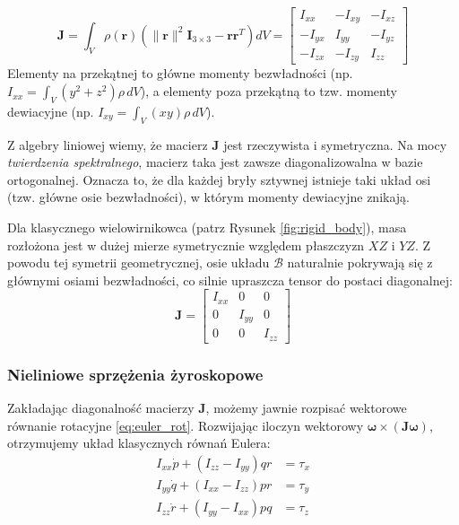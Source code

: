 \begin{equation}
    \mathbf{J} = \int_V \rho(\mathbf{r}) \left( \|\mathbf{r}\|^2 \mathbf{I}_{3\times3} - \mathbf{r}\mathbf{r}^T \right) dV 
    = \begin{bmatrix} 
    I_{xx} & -I_{xy} & -I_{xz} \\ 
    -I_{yx} & I_{yy} & -I_{yz} \\ 
    -I_{zx} & -I_{zy} & I_{zz} 
    \end{bmatrix}
\end{equation}
Elementy na przekątnej to główne momenty bezwładności (np. $I_{xx} = \int_V (y^2 + z^2)\rho \, dV$), a elementy poza przekątną to tzw. momenty dewiacyjne (np. $I_{xy} = \int_V (x y)\rho \, dV$).

Z algebry liniowej wiemy, że macierz $\mathbf{J}$ jest rzeczywista i symetryczna. Na mocy \textit{twierdzenia spektralnego}, macierz taka jest zawsze diagonalizowalna w bazie ortogonalnej. Oznacza to, że dla każdej bryły sztywnej istnieje taki układ osi (tzw. główne osie bezwładności), w którym momenty dewiacyjne znikają. 

Dla klasycznego wielowirnikowca (patrz Rysunek \ref{fig:rigid_body}), masa rozłożona jest w dużej mierze symetrycznie względem płaszczyzn $XZ$ i $YZ$. Z powodu tej symetrii geometrycznej, osie układu $\mathcal{B}$ naturalnie pokrywają się z głównymi osiami bezwładności, co silnie upraszcza tensor do postaci diagonalnej:
\begin{equation}
    \mathbf{J} = \begin{bmatrix} 
    I_{xx} & 0 & 0 \\ 
    0 & I_{yy} & 0 \\ 
    0 & 0 & I_{zz} 
    \end{bmatrix}
\end{equation}

\subsubsection{Nieliniowe sprzężenia żyroskopowe}

Zakładając diagonalność macierzy $\mathbf{J}$, możemy jawnie rozpisać wektorowe równanie rotacyjne \eqref{eq:euler_rot}. Rozwijając iloczyn wektorowy $\boldsymbol{\omega} \times (\mathbf{J} \boldsymbol{\omega})$, otrzymujemy układ klasycznych równań Eulera:
\begin{align}
    I_{xx} \dot{p} + (I_{zz} - I_{yy}) qr &= \tau_x \label{eq:euler_x} \\
    I_{yy} \dot{q} + (I_{xx} - I_{zz}) pr &= \tau_y \label{eq:euler_y} \\
    I_{zz} \dot{r} + (I_{yy} - I_{xx}) pq &= \tau_z \label{eq:euler_z}
\end{align}

